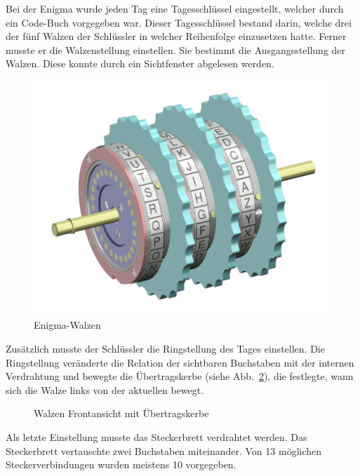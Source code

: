 \documentclass[ngerman, a4paper, footsepline, headsepline]{scrreport}
\newcommand{\figref}[1]{(siehe Abb.~\ref{#1})}
\begin{document}
	\newpage
	
	 Bei der Enigma wurde jeden Tag  eine Tagesschlüssel eingestellt, welcher durch ein Code-Buch vorgegeben war. Dieser Tagesschlüssel bestand darin, welche drei der fünf Walzen der Schlüssler in welcher Reihenfolge einzusetzen hatte. Ferner musste er die Walzenstellung einstellen. Sie bestimmt die Ausgangsstellung der Walzen. Diese konnte durch ein Sichtfenster abgelesen werden.
	
	\begin{figure}[htbp]
		\centering
		\includegraphics[width=.4\linewidth]{Enigma-rotor-set.png}
		\caption{Enigma-Walzen}
		\label{fig:enigma_rotors}
	\end{figure}
	
	Zusätzlich musste der Schlüssler die Ringstellung des Tages einstellen. Die Ringstellung veränderte die Relation der sichtbaren Buchstaben mit der internen Verdrahtung und bewegte die Übertragskerbe \figref{fig:enigma-rotor-contact}, die festlegte, wann sich die Walze links von der aktuellen bewegt.
	
	\begin{figure}[htbp]
		\centering
		\caption{Walzen Frontansicht mit Übertragskerbe}
		\label{fig:enigma-rotor-contact}
	\end{figure}
	
	\newpage
	Als letzte Einstellung musste das Steckerbrett verdrahtet werden. Das Steckerbrett vertauschte zwei Buchstaben miteinander. Von 13 möglichen Steckerverbindungen wurden meistens 10 vorgegeben. 
		
\end{document}
